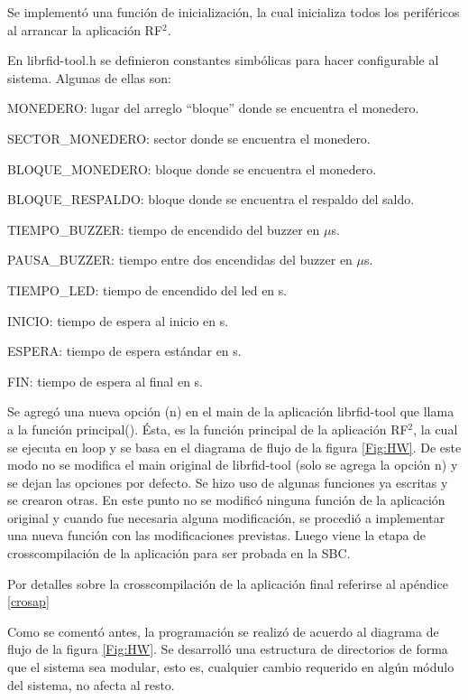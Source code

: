Se implementó una función de inicialización, la cual inicializa todos los periféricos al arrancar la aplicación RF$^{2}$.

En librfid-tool.h se definieron constantes simbólicas para hacer configurable al sistema. Algunas de ellas son:

\bigskip
MONEDERO: lugar del arreglo “bloque” donde se encuentra el monedero.

SECTOR\_MONEDERO: sector donde se encuentra el monedero.

BLOQUE\_MONEDERO: bloque donde se encuentra el monedero.

BLOQUE\_RESPALDO: bloque donde se encuentra el respaldo del saldo.

TIEMPO\_BUZZER: tiempo de encendido del buzzer en $\mu$s.

PAUSA\_BUZZER: tiempo entre dos encendidas del buzzer en $\mu$s.

TIEMPO\_LED: tiempo de encendido del led en s.

INICIO: tiempo de espera al inicio en s. 

ESPERA: tiempo de espera estándar en s. 

FIN: tiempo de espera al final en s.


\bigskip
Se agregó una nueva opción (n) en el main de la aplicación librfid-tool que llama a la función principal(). Ésta, es la función principal de la aplicación RF$^{2}$, la cual se ejecuta en loop y se basa en el diagrama de flujo de la figura \ref{Fig:HW}. De este modo no se modifica el main original de librfid-tool (solo se agrega la opción n) y se dejan las opciones por defecto.
Se hizo uso de algunas funciones ya escritas y se crearon otras. En este punto no se modificó ninguna función de la aplicación original y cuando fue necesaria alguna modificación, se procedió a implementar una nueva función con las modificaciones previstas.
Luego viene la etapa de crosscompilación de la aplicación para ser probada en la SBC.

\bigskip
Por detalles sobre la crosscompilación de la aplicación final referirse al apéndice \ref{crosap}

\bigskip
{}

Como se comentó antes, la programación se realizó de acuerdo al diagrama de flujo de la figura \ref{Fig:HW}.
Se desarrolló una estructura de directorios de forma que el sistema sea modular, esto es, cualquier cambio requerido en algún módulo del sistema, no afecta al resto.


